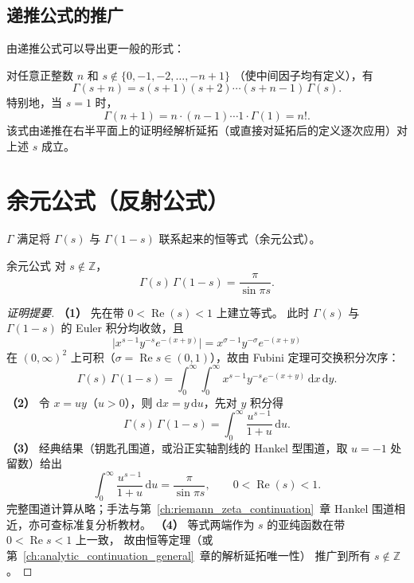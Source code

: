 \subsection{递推公式的推广}

由递推公式可以导出更一般的形式：

\begin{corollary}{}{}\label{cor:gamma-shift}
对任意正整数 $n$ 和 $s \notin \{0,-1,-2,\dots,-n+1\}$
（使中间因子均有定义），有
\[
\Gamma(s+n) = s(s+1)(s+2)\cdots(s+n-1) \, \Gamma(s).
\]
特别地，当 $s = 1$ 时，
\[
\Gamma(n+1) = n \cdot (n-1) \cdots 1 \cdot \Gamma(1) = n!.
\]
该式由递推在右半平面上的证明经解析延拓（或直接对延拓后的定义逐次应用）对上述 $s$ 成立。
\end{corollary}

\section{余元公式（反射公式）}\label{sec:reflection_formula}

$\Gamma$ 满足将 $\Gamma(s)$ 与 $\Gamma(1-s)$ 联系起来的恒等式（余元公式）。

\begin{theorem}{余元公式}{}\label{thm:reflection}
对 $s \notin \mathbb{Z}$，
\begin{equation}
    \Gamma(s) \,\Gamma(1-s) = \frac{\pi}{\sin \pi s}.
    \label{eq:reflection-formula}
\end{equation}
\end{theorem}

\begin{proof}[证明提要]
\textbf{（1）} 先在带 $0 < \operatorname{Re}(s) < 1$ 上建立等式。
此时 $\Gamma(s)$ 与 $\Gamma(1-s)$ 的 Euler 积分均收敛，且
\[
\bigl|x^{s-1} y^{-s} e^{-(x+y)}\bigr|
= x^{\sigma-1} y^{-\sigma} e^{-(x+y)}
\]
在 $(0,\infty)^2$ 上可积（$\sigma=\operatorname{Re}s\in(0,1)$），故由 Fubini 定理可交换积分次序：
\[
\Gamma(s)\,\Gamma(1-s)
= \int_0^\infty\!\int_0^\infty x^{s-1} y^{-s} e^{-(x+y)}\,\mathrm{d}x\,\mathrm{d}y.
\]
\textbf{（2）} 令 $x=uy$（$u>0$），则 $\mathrm{d}x=y\,\mathrm{d}u$，先对 $y$ 积分得
\[
\Gamma(s)\,\Gamma(1-s)
= \int_0^\infty \frac{u^{s-1}}{1+u}\,\mathrm{d}u.
\]
\textbf{（3）} 经典结果（钥匙孔围道，或沿正实轴割线的 Hankel 型围道，取 $u=-1$ 处留数）给出
\[
\int_0^\infty \frac{u^{s-1}}{1+u}\,\mathrm{d}u = \frac{\pi}{\sin \pi s},
\qquad 0 < \operatorname{Re}(s) < 1.
\]
完整围道计算从略；手法与第~\ref{ch:riemann_zeta_continuation}~章 Hankel 围道相近，亦可查标准复分析教材。
\textbf{（4）} 等式两端作为 $s$ 的亚纯函数在带 $0<\operatorname{Re}s<1$ 上一致，
故由恒等定理（或第~\ref{ch:analytic_continuation_general}~章的解析延拓唯一性）
推广到所有 $s \notin \mathbb{Z}$。
\end{proof}

